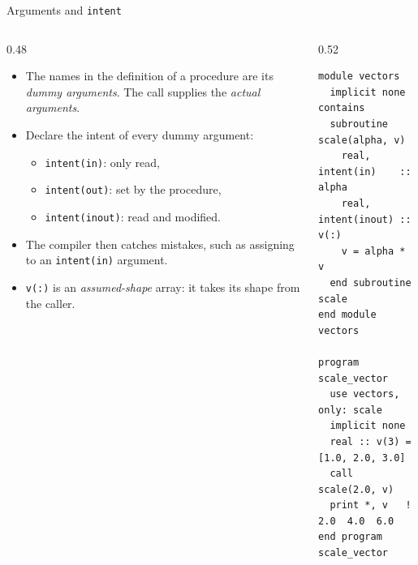 \begin{frame}[fragile]{Arguments and \texttt{intent}}
  \begin{columns}[T]
    \begin{column}{0.48\textwidth}
      \begin{itemize}
        \item The names in the definition of a procedure are its \emph{dummy arguments}. The call supplies the \emph{actual arguments}.
        \item Declare the intent of every dummy argument:
          \begin{itemize}
            \item \texttt{intent(in)}: only read,
            \item \texttt{intent(out)}: set by the procedure,
            \item \texttt{intent(inout)}: read and modified.
          \end{itemize}
        \item The compiler then catches mistakes, such as assigning to an \texttt{intent(in)} argument.
        \item \texttt{v(:)} is an \emph{assumed-shape} array: it takes its shape from the caller.
      \end{itemize}
    \end{column}

    \begin{column}{0.52\textwidth}
      \begin{lstlisting}
module vectors
  implicit none
contains
  subroutine scale(alpha, v)
    real, intent(in)    :: alpha
    real, intent(inout) :: v(:)
    v = alpha * v
  end subroutine scale
end module vectors

program scale_vector
  use vectors, only: scale
  implicit none
  real :: v(3) = [1.0, 2.0, 3.0]
  call scale(2.0, v)
  print *, v   ! 2.0  4.0  6.0
end program scale_vector
      \end{lstlisting}
    \end{column}
  \end{columns}
\end{frame}


